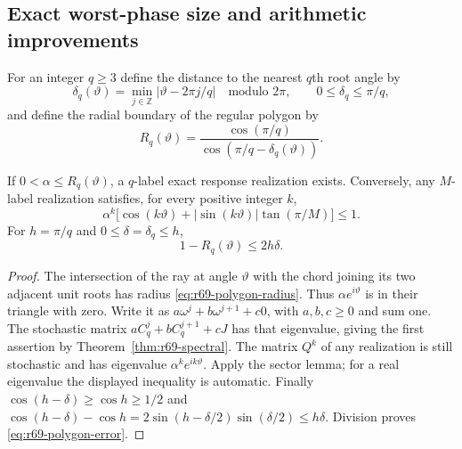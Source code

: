 \subsection{Exact worst-phase size and arithmetic improvements}
For an integer $q\ge3$ define the distance to the nearest $q$th root angle by
\[
 \delta_q(\vartheta)=\min_{j\in\mathbb Z}|\vartheta-2\pi j/q|
             \quad\text{modulo }2\pi,\qquad 0\le\delta_q\le\pi/q,
\]
and define the radial boundary of the regular polygon by
\begin{equation}\label{eq:r69-polygon-radius}
 R_q(\vartheta)=\frac{\cos(\pi/q)}{\cos(\pi/q-\delta_q(\vartheta))}.
\end{equation}

\begin{lemma}\label{lem:r69-arithmetic-tools}
If $0<\alpha\le R_q(\vartheta)$, a $q$-label exact response realization exists. Conversely, any $M$-label realization satisfies, for every positive integer $k$,
\begin{equation}\label{eq:r69-power-obstruction}
 \alpha^k\bigl[\cos(k\vartheta)+|\sin(k\vartheta)|\tan(\pi/M)\bigr]\le1.
\end{equation}
For $h=\pi/q$ and $0\le\delta=\delta_q\le h$,
\begin{equation}\label{eq:r69-polygon-error}
 1-R_q(\vartheta)\le2h\delta.
\end{equation}
\end{lemma}
\begin{proof}
The intersection of the ray at angle $\vartheta$ with the chord joining its two adjacent unit roots has radius \eqref{eq:r69-polygon-radius}. Thus $\alpha e^{i\vartheta}$ is in their triangle with zero. Write it as $a\omega^j+b\omega^{j+1}+c0$, with $a,b,c\ge0$ and sum one. The stochastic matrix $aC_q^j+bC_q^{j+1}+cJ$ has that eigenvalue, giving the first assertion by Theorem~\ref{thm:r69-spectral}. The matrix $Q^k$ of any realization is still stochastic and has eigenvalue $\alpha^ke^{ik\vartheta}$. Apply the sector lemma; for a real eigenvalue the displayed inequality is automatic. Finally $\cos(h-\delta)\ge\cos h\ge1/2$ and
$\cos(h-\delta)-\cos h=2\sin(h-\delta/2)\sin(\delta/2)\le h\delta$.
Division proves \eqref{eq:r69-polygon-error}.
\end{proof}

